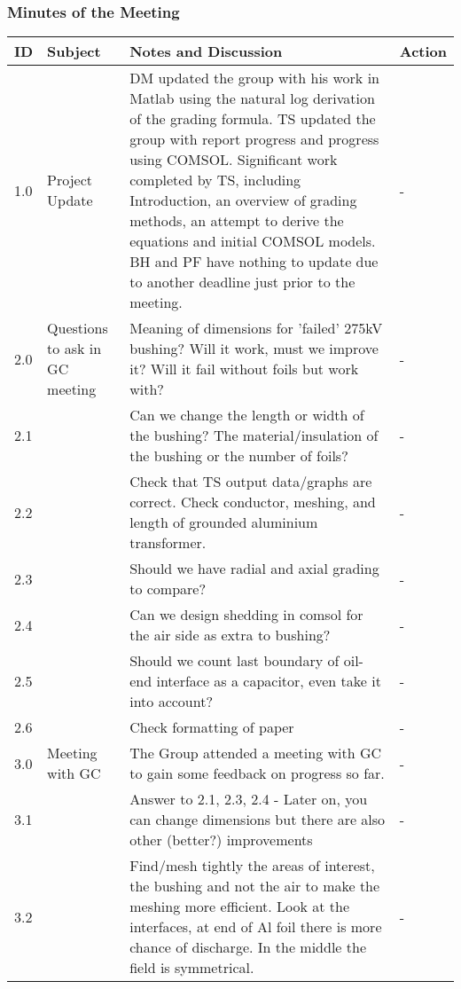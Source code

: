 \subsubsection{Minutes of the Meeting}
\begin{center}
\begin{longtable}{| p{} |>{\raggedright\arraybackslash}p{} | p{} |>{\raggedright\arraybackslash}p{}|} \hline
\textbf{ID} & \textbf{Subject} & \textbf{Notes and Discussion} & \textbf{Action} \\ \hline
\endhead
1.0	&	Project Update	& DM updated the group with his work in Matlab using the natural log derivation of the grading formula. TS updated the group with report progress and progress using COMSOL. Significant work completed by TS, including Introduction, an overview of grading methods, an attempt to derive the equations and initial COMSOL models. BH and PF have nothing to update due to another deadline just prior to the meeting. & -  \\ \hline
2.0	&	Questions to ask in GC meeting	& Meaning of dimensions for 'failed' 275kV bushing? Will it work, must we improve it? Will it fail without foils but work with? & -	 \\ 
2.1	&						& Can we change the length or width of the bushing? The material/insulation of the bushing or the number of foils? & -	 \\ 
2.2	&						& Check that TS output data/graphs are correct. Check conductor, meshing, and length of grounded aluminium transformer. & -	 \\ 
2.3	&						& Should we have radial and axial grading to compare? & -	 \\ 
2.4	&						& Can we design shedding in comsol for the air side as extra to bushing?& -	 \\ 
2.5	&						& Should we count last boundary of oil-end interface as a capacitor, even take it into account?& -	 \\ 
2.6	&						& Check formatting of paper& -	 \\ \hline
3.0 	& 	Meeting with GC 	&	The Group attended a meeting with GC to gain some feedback on progress so far. & - \\
3.1 	& 				&	Answer to 2.1, 2.3, 2.4 - Later on, you can change dimensions but there are also other (better?) improvements & - \\
3.2 	& 				&	Find/mesh tightly the areas of interest, the bushing and not the air to make the meshing more efficient. Look at the interfaces, at end of Al foil there is more chance of discharge. In the middle the field is symmetrical.& - \\

\end{longtable}
\end{center}
